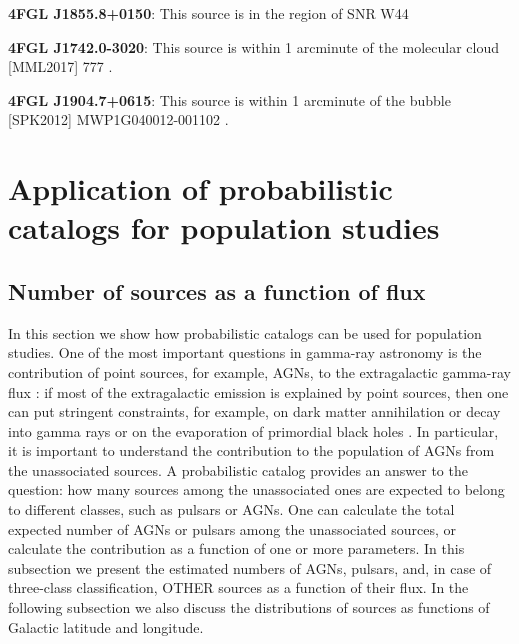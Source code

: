 \documentclass[referee]{aa} %
\newcommand{\lb}{\label}
\begin{document}
\textbf{4}\textbf{FGL J1855.8+0150}: This source is in the region of SNR W44 \citep{2020ApJ...896L..23P}

\textbf{4FGL J1742.0-3020}: This source is within 1 arcminute of the molecular cloud [MML2017] 777 \citep{2017ApJ...834...57M}.

\textbf{4FGL J1904.7+0615}: This source is within 1 arcminute of the bubble [SPK2012] MWP1G040012-001102 \citep{2012MNRAS.424.2442S}.


\section{Application of probabilistic catalogs for population studies}
\lb{sec:pop_studies}

\subsection{Number of sources as a function of flux}
\lb{sec:dNdS}


In this section we show how probabilistic catalogs can be used for population studies.
One of the most important questions in gamma-ray astronomy is the contribution of point sources, 
for example, AGNs, to the extragalactic gamma-ray flux 
\citep[e.g.,][]{2010ApJ...720..435A, 2011ApJ...738..181M, 2016PhRvL.116o1105A, 2016ApJS..225...18Z, 2016ApJ...826L..31Z, 2016ApJ...832..117L, 2018ApJ...856..106D}:
if most of the extragalactic emission is explained by point sources, then one can put stringent constraints, 
for example, on  dark matter annihilation or decay into gamma rays 
\citep{2015ApJ...800L..27A, 2015PhRvD..91l3001D, 2015JCAP...09..008F, 2015PhR...598....1F, 2017ChPhC..41d5104L} or 
on the evaporation of primordial black holes \citep{2010PhRvD..81j4019C}.
In particular, it is important to understand the contribution to the population of AGNs from the unassociated sources.
A probabilistic catalog provides an answer to the question: how many sources among the unassociated ones are expected to belong to different classes, such as pulsars or AGNs. 
One can calculate the total expected number of AGNs or pulsars among the unassociated sources, or calculate the contribution as a function of one or more parameters.
In this subsection we present the estimated numbers of AGNs, pulsars, and, in case of three-class classification, OTHER sources as a function of their flux.
In the following subsection we also discuss the distributions of sources as functions
of Galactic latitude and longitude.
\end{document}
